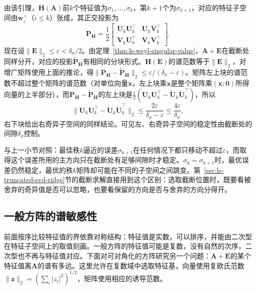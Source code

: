 由该引理，$\bm H(\bm A)$前$k$个特征值为$\sigma_1,\ldots,\sigma_k$，第$k+1$个为$\sigma_{k+1}$，对应的特征子空间由$\bm w_i^+$（$i\leq k$）张成，其正交投影为
\[
 \bm P_{\bm H}=\frac12\begin{bmatrix}\bm U_k\bm U_k^\top&\bm U_k\bm V_k^\top\\\bm V_k\bm U_k^\top&\bm V_k\bm V_k^\top\end{bmatrix}.
\]
现在设$\lVert\bm E\rVert_2\leq\varepsilon<\delta_\sigma/2$。由定理~\ref{thm:ls-weyl-singular-value}，$\bm A+\bm E$在截断处同样分开，对应的投影$\widetilde{\bm P}_{\bm H}$有相同的分块形式。$\bm H(\bm E)$的谱范数等于$\lVert\bm E\rVert_2$，对增广矩阵使用上面的推论，得$\lVert\bm P_{\bm H}-\widetilde{\bm P}_{\bm H}\rVert_2\leq\varepsilon/(\delta_\sigma-\varepsilon)$。矩阵左上块的谱范数不超过整个矩阵的谱范数（对单位向量$\bm x$，左上块乘$\bm x$是整个矩阵乘$(\bm x;\bm0)$所得向量的上半部分），而$\bm P_{\bm H}-\widetilde{\bm P}_{\bm H}$的左上块是$\tfrac12(\bm U_k\bm U_k^\top-\widetilde{\bm U}_k\widetilde{\bm U}_k^\top)$，所以
\[
 \lVert\bm U_k\bm U_k^\top-\widetilde{\bm U}_k\widetilde{\bm U}_k^\top\rVert_2\leq\frac{2\varepsilon}{\delta_\sigma-\varepsilon}\leq\frac{4\varepsilon}{\delta_\sigma},
\]
右下块给出右奇异子空间的同样结论。可见左、右奇异子空间的稳定性由截断处的间隙$\delta_\sigma$控制。

与上一小节对照：最佳秩$k$逼近的误差$\sigma_{k+1}$在任何情况下都只移动不超过$\varepsilon$，而取得这个误差所用的主方向只在截断处有足够间隙时才稳定。$\sigma_k=\sigma_{k+1}$时，最优误差仍然稳定，最优的秩$k$矩阵却可能在不同的子空间之间跳变。第~\ref{sec:ls-truncated-svd-ridge}节的截断求解直接用到这个区别：选取截断位置时，既要看被舍弃的奇异值是否可以忽略，也要看保留的方向是否与舍弃的方向分得开。

\subsection{一般方阵的谱敏感性}
\label{sec:ls-nonnormal-spectral-sensitivity}

前面按序比较特征值的界依靠对称结构：特征值是实数，可以排序，并能由二次型在特征子空间上的取值刻画。一般方阵的特征值可能是复数，没有自然的次序，二次型也不再与特征值对应。下面对可对角化的方阵研究另一个问题：$\bm A+\bm E$的某个特征值离$\bm A$的谱有多远。这里允许在复数域中选取特征基，向量使用复欧氏范数$\lVert\bm z\rVert_2=(\sum_i|z_i|^2)^{1/2}$，矩阵使用相应的诱导范数。

